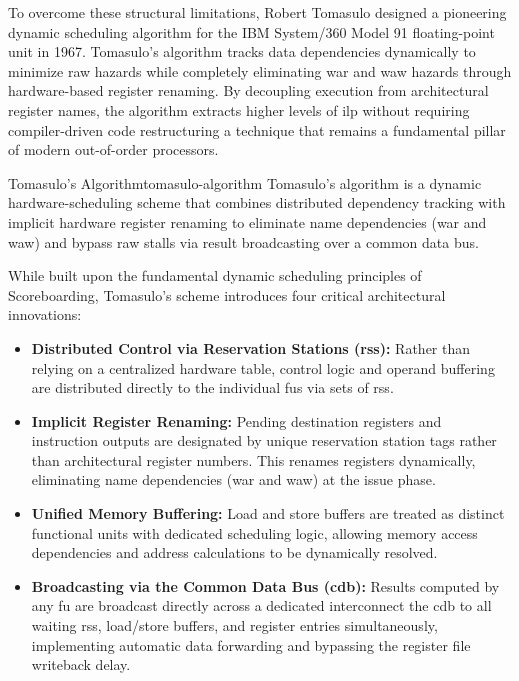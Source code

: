 To overcome these structural limitations, Robert Tomasulo designed a pioneering dynamic scheduling algorithm for the IBM System/360 Model 91 floating-point unit in 1967. Tomasulo's algorithm tracks data dependencies dynamically to minimize \gls{raw} hazards while completely eliminating \gls{war} and \gls{waw} hazards through hardware-based register renaming. By decoupling execution from architectural register names, the algorithm extracts higher levels of \gls{ilp} without requiring compiler-driven code restructuring a technique that remains a fundamental pillar of modern out-of-order processors.

\begin{definition}{Tomasulo's Algorithm}{tomasulo-algorithm}
Tomasulo's algorithm is a dynamic hardware-scheduling scheme that combines distributed dependency tracking with implicit hardware register renaming to eliminate name dependencies (\gls{war} and \gls{waw}) and bypass \gls{raw} stalls via result broadcasting over a common data bus.
\end{definition}

While built upon the fundamental dynamic scheduling principles of Scoreboarding, Tomasulo's scheme introduces four critical architectural innovations:

\begin{itemize}
\item \textbf{Distributed Control via Reservation Stations (\glspl{rs}):} Rather than relying on a centralized hardware table, control logic and operand buffering are distributed directly to the individual \glspl{fu} via sets of \glspl{rs}.
\item \textbf{Implicit Register Renaming:} Pending destination registers and instruction outputs are designated by unique reservation station tags rather than architectural register numbers. This renames registers dynamically, eliminating name dependencies (\gls{war} and \gls{waw}) at the issue phase.
\item \textbf{Unified Memory Buffering:} Load and store buffers are treated as distinct functional units with dedicated scheduling logic, allowing memory access dependencies and address calculations to be dynamically resolved.
\item \textbf{Broadcasting via the Common Data Bus (\gls{cdb}):} Results computed by any \gls{fu} are broadcast directly across a dedicated interconnect the \gls{cdb} to all waiting \glspl{rs}, load/store buffers, and register entries simultaneously, implementing automatic data forwarding and bypassing the register file writeback delay.
\end{itemize}

